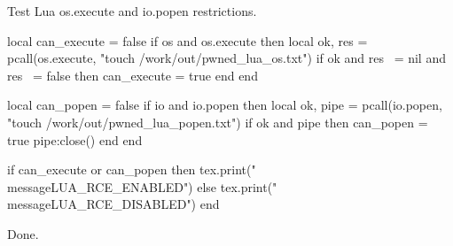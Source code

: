 \documentclass{article}
\begin{document}
Test Lua os.execute and io.popen restrictions.
\begin{luacode*}
local can_execute = false
if os and os.execute then
  local ok, res = pcall(os.execute, "touch /work/out/pwned_lua_os.txt")
  if ok and res ~= nil and res ~= false then
    can_execute = true
  end
end

local can_popen = false
if io and io.popen then
  local ok, pipe = pcall(io.popen, "touch /work/out/pwned_lua_popen.txt")
  if ok and pipe then
    can_popen = true
    pipe:close()
  end
end

if can_execute or can_popen then
  tex.print("\\message{LUA_RCE_ENABLED}")
else
  tex.print("\\message{LUA_RCE_DISABLED}")
end
\end{luacode*}
Done.
\end{document}
